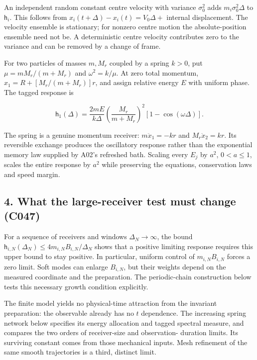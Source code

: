 \documentclass[11pt,a4paper]{article}
\begin{document}
An independent random constant centre velocity with variance
\(\sigma_0^2\) adds \(m_i\sigma_0^2\Delta\) to \(\mathsf h_i\). This
follows from \(x_i(t+\Delta)-x_i(t)=V_0\Delta+\) internal displacement.
The velocity ensemble is stationary; for nonzero centre motion the
absolute-position ensemble need not be. A deterministic centre velocity
contributes zero to the variance and can be removed by a change of
frame.

For two particles of masses \(m,M_r\) coupled by a spring \(k>0\), put
\(\mu=mM_r/(m+M_r)\) and \(\omega^2=k/\mu\). At zero total momentum,
\(x_1=R+[M_r/(m+M_r)]r\), and assign relative energy \(E\) with uniform
phase. The tagged response is

\[
\mathsf h_1(\Delta)=
\frac{2mE}{k\Delta}\left(\frac{M_r}{m+M_r}\right)^2
[1-\cos(\omega\Delta)].
\]

The spring is a genuine momentum receiver: \(m\ddot x_1=-kr\) and
\(M_r\ddot x_2=kr\). Its reversible exchange produces the oscillatory
response rather than the exponential memory law supplied by A02's
refreshed bath. Scaling every \(E_j\) by \(a^2\), \(0<a\le1\), scales
the entire response by \(a^2\) while preserving the equations,
conservation laws and speed margin.

\hypertarget{what-the-large-receiver-test-must-change-c047}{%
\subsection{4. What the large-receiver test must change
(C047)}\label{what-the-large-receiver-test-must-change-c047}}

For a sequence of receivers and windows \(\Delta_N\to\infty\), the bound
\(\mathsf h_{i,N}(\Delta_N)\le4m_{i,N}B_{i,N}/\Delta_N\) shows that a
positive limiting response requires this upper bound to stay positive.
In particular, uniform control of \(m_{i,N}B_{i,N}\) forces a zero
limit. Soft modes can enlarge \(B_{i,N}\), but their weights depend on
the measured coordinate and the preparation. The periodic-chain
construction below tests this necessary growth condition explicitly.

The finite model yields no physical-time attraction from the invariant
preparation: the observable already has no \(t\) dependence. The
increasing spring network below specifies its energy allocation and
tagged spectral measure, and compares the two orders of receiver-size
and observation- duration limits. Its surviving constant comes from
those mechanical inputs. Mesh refinement of the same smooth trajectories
is a third, distinct limit.
\end{document}
